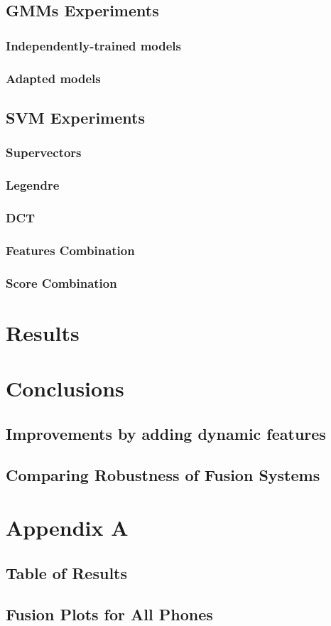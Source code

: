 \documentclass[11pt,a4paper]{tesis}
\begin{document}
	\section{GMMs Experiments}
		\subsection{Independently-trained models}
		\subsection{Adapted models}
	\section{SVM Experiments}
		\subsection{Supervectors}
		\subsection{Legendre}
			
		\subsection{DCT}
		\subsection{Features Combination}
		\subsection{Score Combination}

\chapter{Results}
	

\chapter{Conclusions}
	\section{Improvements by adding dynamic features}
	\section{Comparing Robustness of Fusion Systems}

\chapter{Appendix A}
	\section{Table of Results}
	\section{Fusion Plots for All Phones}

\printbibliography
 
\end{document}
